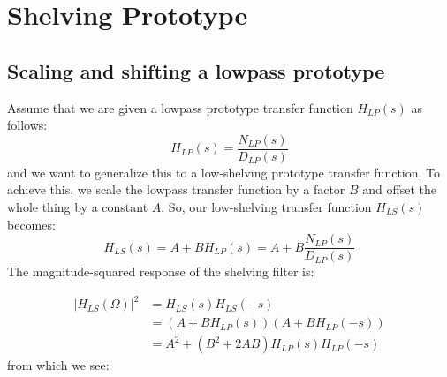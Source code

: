 \section{Shelving Prototype}

\subsection{Scaling and shifting a lowpass prototype}
Assume that we are given a lowpass prototype transfer function $H_{LP}(s)$ as follows:
\begin{equation}
 H_{LP}(s) = \frac{N_{LP}(s)}{D_{LP}(s)} 
\end{equation}
and we want to generalize this to a low-shelving prototype transfer function. To achieve this, we scale the lowpass transfer function by a factor $B$ and offset the whole thing by a constant $A$. So, our low-shelving transfer function $H_{LS}(s)$ becomes:
\begin{equation}
\label{eqn:LowpassWithScaleAndOffset}
 H_{LS}(s) = A + B H_{LP}(s) = A + B \frac{N_{LP}(s)}{D_{LP}(s)} 
\end{equation}
The magnitude-squared response of the shelving filter is:

\begin{equation}
\begin{aligned}
 |H_{LS}(\Omega)|^2 &= H_{LS}(s) H_{LS}(-s) \\
                    &= (A + B H_{LP}(s)) (A + B H_{LP}(-s)) \\
                    &= A^2 + (B^2 + 2AB) H_{LP}(s) H_{LP}(-s)
\end{aligned}
\end{equation}
from which we see:


